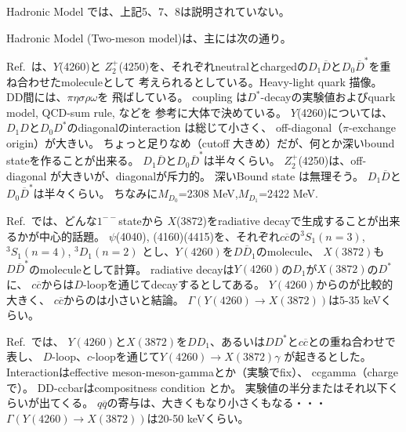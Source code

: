\documentclass[a4j]{jarticle}
\def\cbar{\overline{{c}}}
\begin{document}
Hadronic Model
では、上記5、7、8は説明されていない。


Hadronic Model (Two-meson model)は、主には次の通り。

Ref.\ \cite{Ding:2008gr}は、$Y$(4260)と
$Z_2^+$(4250)を、それぞれneutralとchargedの$D_1\overline{D}$と$D_0\overline{D}^*$を重ね合わせたmoleculeとして
考えられるとしている。Heavy-light quark 描像。
DD間には、$\pi\eta\sigma\rho\omega$を
飛ばしている。
coupling は$D^*$-decayの実験値およびquark model, QCD-sum rule, などを
参考に大体で決めている。
$Y$(4260)については、$D_1D$と$D_0D^*$のdiagonalのinteraction は総じて小さく、
off-diagonal（$\pi$-exchange origin）が大きい。
ちょっと足りなめ（cutoff 大きめ）だが、何とか深いbound stateを作ることが出来る。
$D_1\overline{D}$と$D_0\overline{D}^*$は半々くらい。
$Z_2^+$(4250)は、off-diagonal が大きいが、diagonalが斥力的。
深いBound state は無理そう。
$D_1\overline{D}$と$D_0\overline{D}^*$は半々くらい。
ちなみに$M_{D_0}$=2308 MeV,$M_{D_1}$=2422 MeV.

Ref.\ \cite{Guo:2013nza}では、どんな$1^{--}$stateから
$X$(3872)をradiative decayで生成することが出来るかが中心的話題。
$\psi$(4040),
(4160)(4415)を、それぞれ$c\cbar$の$^3S_1(n=3)$, $^3S_1(n=4)$, $^3D_1(n=2)$
とし、$Y(4260)$を$D\overline{D}_1$のmolecule、
$X(3872)$も$D\overline{D}^*$のmoleculeとして計算。
radiative decayは$Y(4260)$の$D_1$が$X(3872)$の$D^*$に、
$c\cbar$からは$D$-loopを通じてdecayするとしてある。
$Y(4260)$からのが比較的大きく、
$c\cbar$からのは小さいと結論。
$\Gamma(Y(4260)\rightarrow X(3872))$は5-35 keVくらい。

Ref.\ \cite{Dong:2014zka}では、
$Y(4260)$と$X(3872)$を$DD_1$、あるいは$DD^*$と$c\cbar$との重ね合わせで
表し、
$D$-loop、$c$-loopを通じて$Y(4260)\rightarrow X(3872)\gamma$
が起きるとした。
Interactionはeffective meson-meson-gammaとか（実験でfix）、
ccgamma（chargeで）。
DD-ccbarはcompositness condition とか。
実験値の半分またはそれ以下くらいが出てくる。
$q\overline{q}$の寄与は、大きくもなり小さくもなる・・・
$\Gamma(Y(4260)\rightarrow X(3872))$は20-50 keVくらい。
\end{document}
